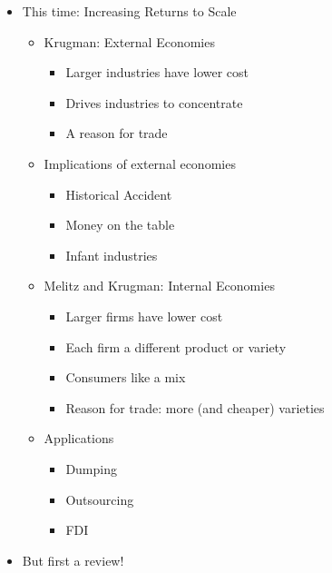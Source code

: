 \documentclass[ignorenonframetext,]{beamer}
\begin{document}
\begin{frame}
\begin{itemize}
\itemsep1pt\parskip0pt
\item
  This time: Increasing Returns to Scale
  \begin{itemize}
        \item Krugman: External Economies 
        \begin{itemize}
            \item Larger industries have lower cost
            \item Drives industries to concentrate
            \item A reason for trade
        \end{itemize}
        \item Implications of external economies 
        \begin{itemize}
            \item Historical Accident
            \item Money on the table
            \item Infant industries
        \end{itemize}
        \item Melitz and Krugman: Internal Economies
        \begin{itemize}
            \item Larger firms have lower cost 
            \item Each firm a different product or variety
            \item Consumers like a mix
            \item Reason for trade: more (and cheaper) varieties
        \end{itemize}
        \item Applications
        \begin{itemize}
            \item Dumping
            \item Outsourcing
            \item FDI
        \end{itemize}
    \end{itemize}
\end{itemize}

\end{frame}

\begin{frame}
    \begin{itemize}
        \item But first a review!
    \end{itemize}
\end{frame}
\end{document}
